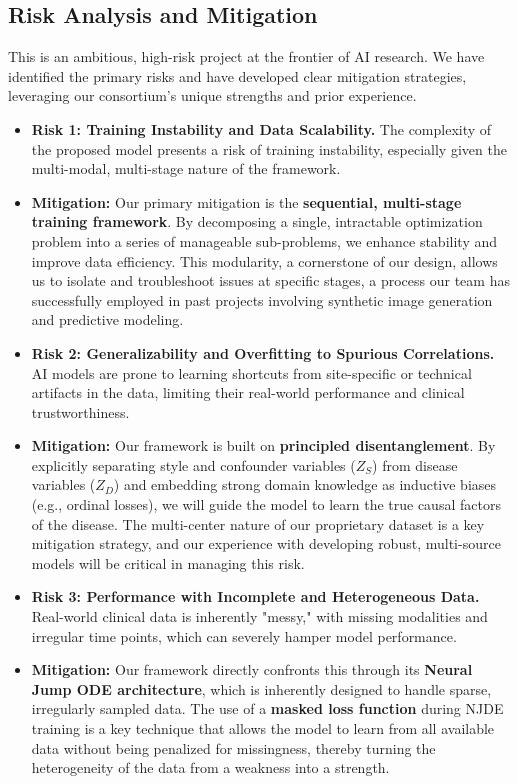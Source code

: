 \documentclass[11pt, a4paper]{article}
\begin{document}
\subsection{Risk Analysis and Mitigation}
This is an ambitious, high-risk project at the frontier of AI research. We have identified the primary risks and have developed clear mitigation strategies, leveraging our consortium's unique strengths and prior experience.
\begin{itemize}
    \item \textbf{Risk 1: Training Instability and Data Scalability.} The complexity of the proposed model presents a risk of training instability, especially given the multi-modal, multi-stage nature of the framework.
    \item \textbf{Mitigation:} Our primary mitigation is the \textbf{sequential, multi-stage training framework}. By decomposing a single, intractable optimization problem into a series of manageable sub-problems, we enhance stability and improve data efficiency. This modularity, a cornerstone of our design, allows us to isolate and troubleshoot issues at specific stages, a process our team has successfully employed in past projects involving synthetic image generation and predictive modeling.

    \item \textbf{Risk 2: Generalizability and Overfitting to Spurious Correlations.} AI models are prone to learning shortcuts from site-specific or technical artifacts in the data, limiting their real-world performance and clinical trustworthiness.
    \item \textbf{Mitigation:} Our framework is built on \textbf{principled disentanglement}. By explicitly separating style and confounder variables ($Z_S$) from disease variables ($Z_D$) and embedding strong domain knowledge as inductive biases (e.g., ordinal losses), we will guide the model to learn the true causal factors of the disease. The multi-center nature of our proprietary dataset is a key mitigation strategy, and our experience with developing robust, multi-source models will be critical in managing this risk.

    \item \textbf{Risk 3: Performance with Incomplete and Heterogeneous Data.} Real-world clinical data is inherently "messy," with missing modalities and irregular time points, which can severely hamper model performance.
    \item \textbf{Mitigation:} Our framework directly confronts this through its \textbf{Neural Jump ODE architecture}, which is inherently designed to handle sparse, irregularly sampled data. The use of a \textbf{masked loss function} during NJDE training is a key technique that allows the model to learn from all available data without being penalized for missingness, thereby turning the heterogeneity of the data from a weakness into a strength.


\end{itemize}
\end{document}
